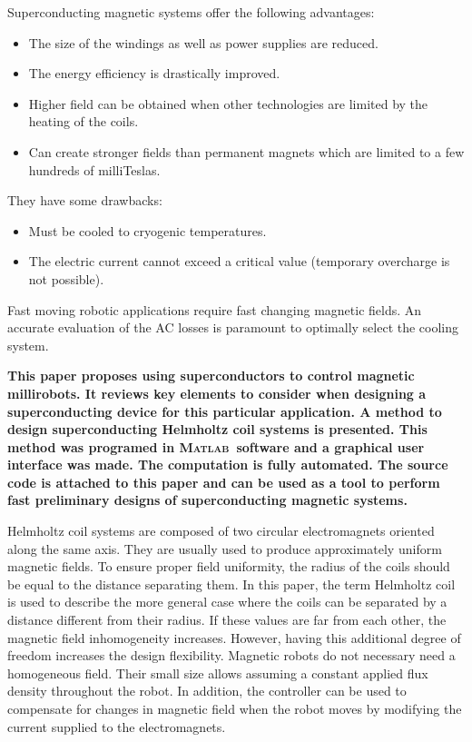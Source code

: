 \documentclass{ws-jmrr}
\newcommand{\MATLAB}{\textsc{Matlab}}
\begin{document}
\begin{multicols}{2}
Superconducting magnetic systems offer the following advantages:
\begin{itemize}[leftmargin=*]
\item The size of the windings as well as power supplies are reduced.
\item The energy efficiency is drastically improved.
\item Higher field can be obtained when other technologies are limited by the heating of the coils.
\item Can create stronger fields than permanent magnets which are limited to a few hundreds of milliTeslas.
\end{itemize}
They have some drawbacks:
\begin{itemize}[leftmargin=*]
\item Must be cooled to cryogenic temperatures.
\item The electric current cannot exceed a critical value (temporary overcharge is not possible).
\end{itemize}
Fast moving robotic applications require fast changing magnetic fields. An accurate evaluation of the AC losses is paramount to optimally select the cooling system.\par
\textbf{
This paper proposes using superconductors to control magnetic millirobots. It reviews key elements to consider when designing a superconducting device for this particular application. A method to design superconducting Helmholtz coil systems is presented. This method was programed in \MATLAB ~software and a graphical user interface was made. The computation is fully automated. The source code is attached to this paper and can be used as a tool to perform fast preliminary designs of superconducting magnetic systems.}\par

Helmholtz coil systems are composed of two circular electromagnets oriented along the same axis. They are usually used to produce approximately uniform magnetic fields. To ensure proper field uniformity, the radius of the coils should be equal to the distance separating them. In this paper, the term Helmholtz coil is used to describe the more general case where the coils can be separated by a distance different from their radius. If these values are far from each other, the magnetic field inhomogeneity increases. However, having this additional degree of freedom increases the design flexibility. Magnetic robots do not necessary need a homogeneous field. Their small size allows assuming a constant applied flux density throughout the robot. In addition, the controller can be used to compensate for changes in magnetic field when the robot moves by modifying the current supplied to the electromagnets.


\end{multicols}
\end{document}
